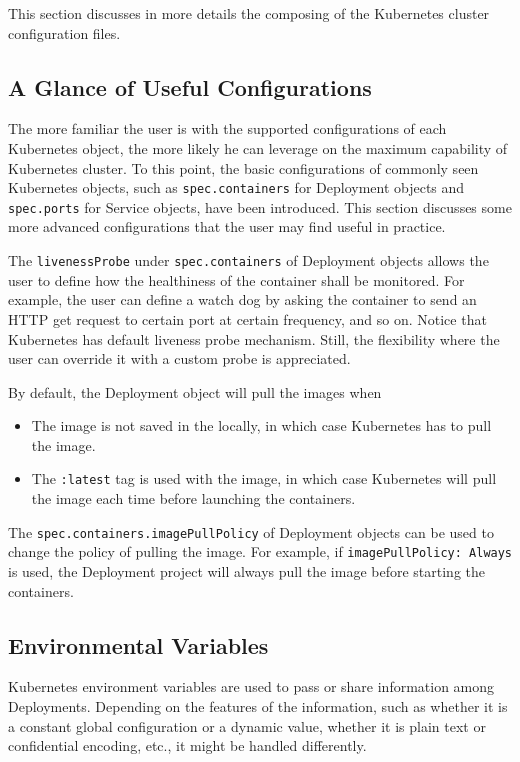 This section discusses in more details the composing of the Kubernetes cluster configuration files.

\subsection{A Glance of Useful Configurations}

The more familiar the user is with the supported configurations of each Kubernetes object, the more likely he can leverage on the maximum capability of Kubernetes cluster. To this point, the basic configurations of commonly seen Kubernetes objects, such as \verb|spec.containers| for Deployment objects and \verb|spec.ports| for Service objects, have been introduced. This section discusses some more advanced configurations that the user may find useful in practice.

The \verb|livenessProbe| under \verb|spec.containers| of Deployment objects allows the user to define how the healthiness of the container shall be monitored. For example, the user can define a watch dog by asking the container to send an HTTP get request to certain port at certain frequency, and so on. Notice that Kubernetes has default liveness probe mechanism. Still, the flexibility where the user can override it with a custom probe is appreciated.

By default, the Deployment object will pull the images when
\begin{itemize}
  \item The image is not saved in the locally, in which case Kubernetes has to pull the image.
  \item The \verb|:latest| tag is used with the image, in which case Kubernetes will pull the image each time before launching the containers.
\end{itemize}
The \texttt{spec.containers.imagePullPolicy} of Deployment objects can be used to change the policy of pulling the image. For example, if \texttt{imagePullPolicy: Always} is used, the Deployment project will always pull the image before starting the containers.

\subsection{Environmental Variables}

Kubernetes environment variables are used to pass or share information among Deployments. Depending on the features of the information, such as whether it is a constant global configuration or a dynamic value, whether it is plain text or confidential encoding, etc., it might be handled differently.

